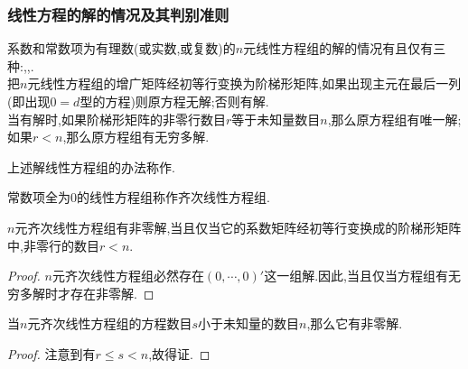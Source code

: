 \documentclass{ctexart}
\begin{document}
\subsubsection{线性方程的解的情况及其判别准则}
\begin{theorem}[线性方程的解的情况及其判别准则]
    系数和常数项为有理数(或实数,或复数)的$n$元线性方程组的解的情况有且仅有三种:,,.\\
    把$n$元线性方程组的增广矩阵经初等行变换为阶梯形矩阵,如果出现主元在最后一列(即出现$0=d$型的方程)则原方程无解;否则有解.\\当有解时,如果阶梯形矩阵的非零行数目$r$等于未知量数目$n$,那么原方程组有唯一解;如果$r<n$,那么原方程组有无穷多解.
\end{theorem}
上述解线性方程组的办法称作.
\begin{definition}[齐次线性方程组]
    常数项全为$0$的线性方程组称作齐次线性方程组.
\end{definition}
\begin{lemma}[齐次线性方程组有解的充要条件]
    $n$元齐次线性方程组有非零解,当且仅当它的系数矩阵经初等行变换成的阶梯形矩阵中,非零行的数目$r<n$.
\end{lemma}
\begin{proof}
    $n$元齐次线性方程组必然存在$(0,\cdots,0)'$这一组解.因此,当且仅当方程组有无穷多解时才存在非零解.
\end{proof}
\begin{lemma}[齐次线性方程组有解的充分条件]
    当$n$元齐次线性方程组的方程数目$s$小于未知量的数目$n$,那么它有非零解.
\end{lemma}
\begin{proof}
    注意到有$r\leqslant s<n$,故得证.
\end{proof}
\end{document}
